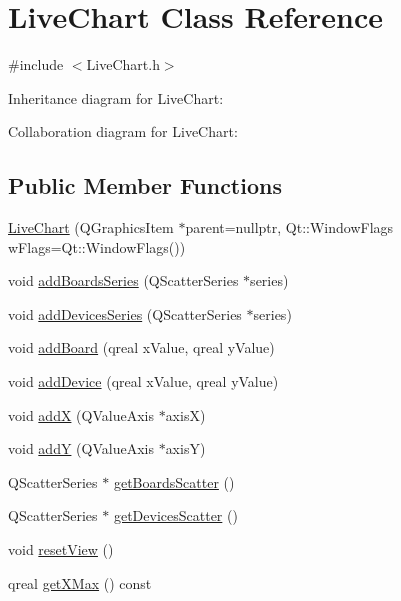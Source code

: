 \hypertarget{class_live_chart}{}\section{Live\+Chart Class Reference}
\label{class_live_chart}


{\ttfamily \#include $<$Live\+Chart.\+h$>$}



Inheritance diagram for Live\+Chart\+:


Collaboration diagram for Live\+Chart\+:
\subsection*{Public Member Functions}
\begin{DoxyCompactItemize}
\item 
\hyperlink{class_live_chart_ac03ec2247d586d044a7b5483f58df92d}{Live\+Chart} (Q\+Graphics\+Item $\ast$parent=nullptr, Qt\+::\+Window\+Flags w\+Flags=Qt\+::\+Window\+Flags())
\item 
void \hyperlink{class_live_chart_a611bd4a559e178df00527a138fa4b3bf}{add\+Boards\+Series} (Q\+Scatter\+Series $\ast$series)
\item 
void \hyperlink{class_live_chart_a69d9fa408a72a003c8995267dd26b712}{add\+Devices\+Series} (Q\+Scatter\+Series $\ast$series)
\item 
void \hyperlink{class_live_chart_ac721a5c2154777d516f8f280ebee3182}{add\+Board} (qreal x\+Value, qreal y\+Value)
\item 
void \hyperlink{class_live_chart_a216e4fb970fceb8d6234ef40f0399391}{add\+Device} (qreal x\+Value, qreal y\+Value)
\item 
void \hyperlink{class_live_chart_a978b5af6dbc43e47c239c002da321444}{addX} (Q\+Value\+Axis $\ast$axisX)
\item 
void \hyperlink{class_live_chart_a6d066e097ed4285fbc4488b9c8dc8413}{addY} (Q\+Value\+Axis $\ast$axisY)
\item 
Q\+Scatter\+Series $\ast$ \hyperlink{class_live_chart_a568a649fcc3cdeb7460a7e84e0572060}{get\+Boards\+Scatter} ()
\item 
Q\+Scatter\+Series $\ast$ \hyperlink{class_live_chart_a8cc7eeca378b44c8c3e0c5f747c4f371}{get\+Devices\+Scatter} ()
\item 
void \hyperlink{class_live_chart_a337dce6b6f316c6bdb186c5248794b89}{reset\+View} ()
\item 
qreal \hyperlink{class_live_chart_a98a181f02aab9a8520c827918c10b17b}{get\+X\+Max} () const

\end{DoxyCompactItemize}
